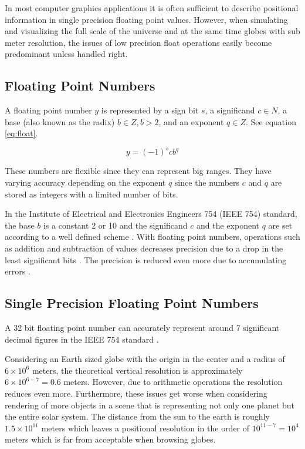 In most computer graphics applications it is often sufficient to describe positional information in single precision floating point values. However, when simulating and visualizing the full scale of the universe and at the same time globes with sub meter resolution, the issues of low precision float operations easily become predominant unless handled right.

\subsection{Floating Point Numbers}
A floating point number $y$ is represented by a sign bit $s$, a significand $c \in N$, a base (also known as the radix) $b \in Z, b > 2$, and an exponent $q \in Z$. See equation \ref{eq:float}.

\begin{equation}
\label{eq:float}
y=(-1)^s c b^q
\end{equation}

These numbers are flexible since they can represent big ranges. They have varying accuracy depending on the exponent $q$ since the numbers $c$ and $q$ are stored as integers with a limited number of bits.

In the Institute of Electrical and Electronics Engineers 754 (IEEE 754) standard, the base $b$ is a constant 2 or 10 and the significand $c$ and the exponent $q$ are set according to a well defined scheme \cite{ieee754}. With floating point numbers, operations such as addition and subtraction of values decreases precision due to a drop in the least significant bits \cite{cozzi11}. The precision is reduced even more due to accumulating errors \cite{cozzi11}.

\subsection{Single Precision Floating Point Numbers}

A 32 bit floating point number can accurately represent around 7 significant decimal figures in the IEEE 754 standard \cite{cozzi11}.

Considering an Earth sized globe with the origin in the center and a radius of $6 \times 10^6$ meters, the theoretical vertical resolution is approximately $6 \times 10^{6-7} = 0.6$ meters. However, due to arithmetic operations the resolution reduces even more. Furthermore,  these issues get worse when considering rendering of more objects in a scene that is representing not only one planet but the entire solar system. The distance from the sun to the earth is roughly $1.5 \times 10^{11}$ meters which leaves a positional resolution in the order of $10^{11 - 7} = 10^4$ meters which is far from acceptable when browsing globes.

